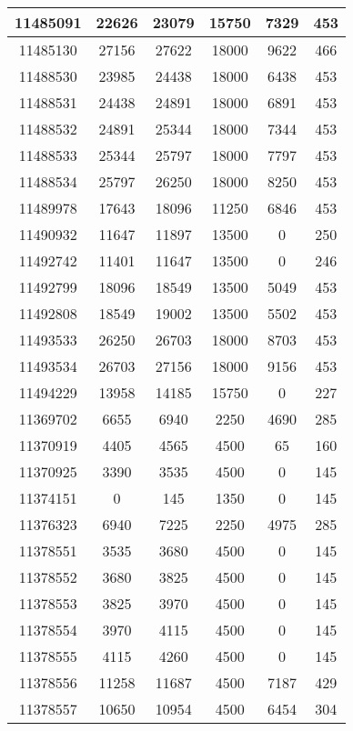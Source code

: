 \begin{appendices}
\begin{center}
\begin{longtable}{|c|c|c|c|c|c|}
11485091 & 22626 & 23079 & 15750 & 7329  & 453 \\ \hline
11485130 & 27156 & 27622 & 18000 & 9622  & 466 \\ \hline
11488530 & 23985 & 24438 & 18000 & 6438  & 453 \\ \hline
11488531 & 24438 & 24891 & 18000 & 6891  & 453 \\ \hline
11488532 & 24891 & 25344 & 18000 & 7344  & 453 \\ \hline
11488533 & 25344 & 25797 & 18000 & 7797  & 453 \\ \hline
11488534 & 25797 & 26250 & 18000 & 8250  & 453 \\ \hline
11489978 & 17643 & 18096 & 11250 & 6846  & 453 \\ \hline
11490932 & 11647 & 11897 & 13500 & 0     & 250 \\ \hline
11492742 & 11401 & 11647 & 13500 & 0     & 246 \\ \hline
11492799 & 18096 & 18549 & 13500 & 5049  & 453 \\ \hline
11492808 & 18549 & 19002 & 13500 & 5502  & 453 \\ \hline
11493533 & 26250 & 26703 & 18000 & 8703  & 453 \\ \hline
11493534 & 26703 & 27156 & 18000 & 9156  & 453 \\ \hline
11494229 & 13958 & 14185 & 15750 & 0     & 227 \\ \hline
11369702 & 6655  & 6940  & 2250  & 4690  & 285 \\ \hline
11370919 & 4405  & 4565  & 4500  & 65    & 160 \\ \hline
11370925 & 3390  & 3535  & 4500  & 0     & 145 \\ \hline
11374151 & 0     & 145   & 1350  & 0     & 145 \\ \hline
11376323 & 6940  & 7225  & 2250  & 4975  & 285 \\ \hline
11378551 & 3535  & 3680  & 4500  & 0     & 145 \\ \hline
11378552 & 3680  & 3825  & 4500  & 0     & 145 \\ \hline
11378553 & 3825  & 3970  & 4500  & 0     & 145 \\ \hline
11378554 & 3970  & 4115  & 4500  & 0     & 145 \\ \hline
11378555 & 4115  & 4260  & 4500  & 0     & 145 \\ \hline
11378556 & 11258 & 11687 & 4500  & 7187  & 429 \\ \hline
11378557 & 10650 & 10954 & 4500  & 6454  & 304 \\ \hline

\end{longtable}
\end{center}
\end{appendices}
